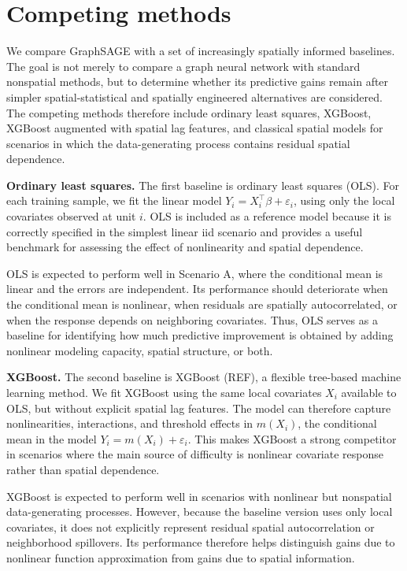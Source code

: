 \documentclass[ASNA, twocolumn]{USG} %
\begin{document}
\section{Competing methods}
\label{sec:baselines}

We compare GraphSAGE with a set of increasingly spatially informed baselines. The goal is not merely to compare a graph neural network with standard nonspatial methods, but to determine whether its predictive gains remain after simpler spatial-statistical and spatially engineered alternatives are considered. The competing methods therefore include ordinary least squares, XGBoost, XGBoost augmented with spatial lag features, and classical spatial models for scenarios in which the data-generating process contains residual spatial dependence.

\noindent \textbf{Ordinary least squares.}
The first baseline is ordinary least squares (OLS). For each training sample, we fit the linear model
$Y_i = X_i^\top\beta + \varepsilon_i$,
using only the local covariates observed at unit \(i\). OLS is included as a reference model because it is correctly specified in the simplest linear iid scenario and provides a useful benchmark for assessing the effect of nonlinearity and spatial dependence.

OLS is expected to perform well in Scenario A, where the conditional mean is linear and the errors are independent. Its performance should deteriorate when the conditional mean is nonlinear, when residuals are spatially autocorrelated, or when the response depends on neighboring covariates. Thus, OLS serves as a baseline for identifying how much predictive improvement is obtained by adding nonlinear modeling capacity, spatial structure, or both.

\noindent \textbf{XGBoost.}
The second baseline is XGBoost (REF), a flexible tree-based machine learning method. We fit XGBoost using the same local covariates \(X_i\) available to OLS, but without explicit spatial lag features. The model can therefore capture nonlinearities, interactions, and threshold effects in $m(X_i)$, the conditional mean in the model $Y_i = m(X_i) + \varepsilon_i$. This makes XGBoost a strong competitor in scenarios where the main source of difficulty is nonlinear covariate response rather than spatial dependence.

XGBoost is expected to perform well in scenarios with nonlinear but nonspatial data-generating processes. However, because the baseline version uses only local covariates, it does not explicitly represent residual spatial autocorrelation or neighborhood spillovers. Its performance therefore helps distinguish gains due to nonlinear function approximation from gains due to spatial information.
\end{document}
